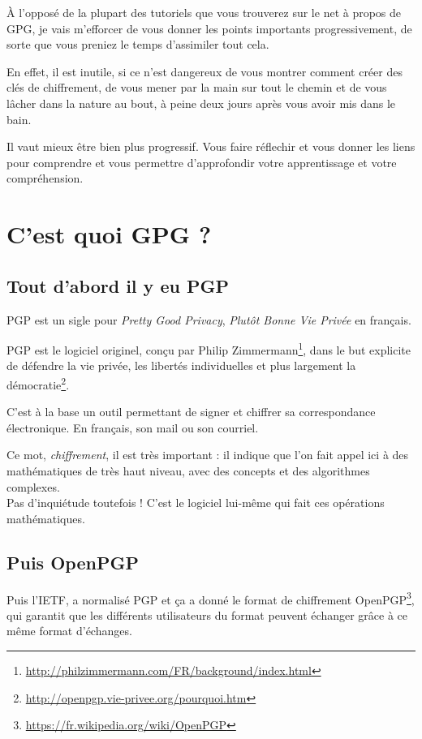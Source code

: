 À l'opposé de la plupart des tutoriels que vous trouverez sur le net à
propos de GPG, je vais m'efforcer de vous donner les points importants
progressivement, de sorte que vous preniez le temps d'assimiler tout
cela.

En effet, il est inutile, si ce n'est dangereux de vous montrer comment
créer des clés de chiffrement, de vous mener par la main sur tout le
chemin et de vous lâcher dans la nature au bout, à peine deux jours
après vous avoir mis dans le bain.

Il vaut mieux être bien plus progressif. Vous faire réflechir et vous
donner les liens pour comprendre et vous permettre d'approfondir votre
apprentissage et votre compréhension.

\section{C'est quoi GPG ?}\label{cest-quoi-gpg}

\subsection{Tout d'abord il y eu PGP}\label{tout-dabord-il-y-eu-pgp}

PGP est un sigle pour \emph{Pretty Good Privacy}, \emph{Plutôt Bonne Vie Privée} en français.

PGP est le logiciel originel, conçu par Philip Zimmermann\footnote{\url{http://philzimmermann.com/FR/background/index.html}}, dans le
but explicite de défendre la vie privée, les libertés individuelles et plus largement la démocratie\footnote{\url{http://openpgp.vie-privee.org/pourquoi.htm}}.

C'est à la base un outil permettant de signer et chiffrer sa correspondance électronique. En français, son mail ou son courriel.

Ce mot, \emph{chiffrement}, il est très important : il indique que l'on
fait appel ici à des mathématiques de très haut niveau, avec des
concepts et des algorithmes complexes.\\Pas d'inquiétude toutefois !
C'est le logiciel lui-même qui fait ces opérations mathématiques.

\subsection{Puis OpenPGP}\label{puis-openpgp}

Puis l'IETF, a normalisé PGP et ça a donné le format de chiffrement OpenPGP\footnote{\url{https://fr.wikipedia.org/wiki/OpenPGP}}, qui garantit que
les différents utilisateurs du format peuvent échanger grâce à ce même format d'échanges.

